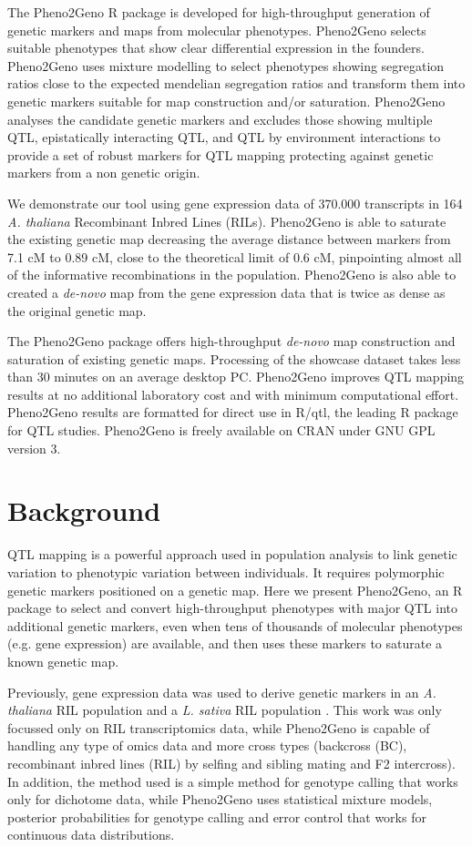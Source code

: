 The Pheno2Geno R package is developed for high-throughput generation of genetic markers and maps from 
molecular phenotypes. Pheno2Geno selects suitable phenotypes that show clear differential expression 
in the founders. Pheno2Geno uses mixture modelling to select phenotypes showing segregation ratios 
close to the expected mendelian segregation ratios and transform them into genetic markers suitable 
for map construction and/or saturation. Pheno2Geno analyses the candidate genetic markers and excludes 
those showing multiple QTL, epistatically interacting QTL, and QTL by environment interactions to 
provide a set of robust markers for QTL mapping protecting against genetic markers from a non genetic 
origin.

We demonstrate our tool using gene expression data of 370.000 transcripts in 164 \emph{A. thaliana} 
Recombinant Inbred Lines (RILs). Pheno2Geno is able to saturate the existing genetic map decreasing 
the average distance between markers from 7.1 cM to 0.89 cM, close to the theoretical limit of 0.6 cM, 
pinpointing almost all of the informative recombinations in the population. Pheno2Geno is also able 
to created a \emph{de-novo} map from the gene expression data that is twice as dense as the original 
genetic map.

The Pheno2Geno package offers high-throughput \emph{de-novo} map construction and saturation of 
existing genetic maps. Processing of the showcase dataset takes less than 30 minutes on an average 
desktop PC. Pheno2Geno improves QTL mapping results at no additional laboratory cost and with 
minimum computational effort. Pheno2Geno results are formatted for direct use in R/qtl, the leading 
R package for QTL studies. Pheno2Geno is freely available on CRAN under GNU GPL version 3.

\section{Background}
QTL mapping \cite{Lander:1989} is a powerful approach used in population analysis to link genetic 
variation to phenotypic variation between individuals. It requires polymorphic genetic markers 
positioned on a genetic map. Here we present Pheno2Geno, an R package to select and convert 
high-throughput phenotypes with major QTL into additional genetic markers, even when tens of 
thousands of molecular phenotypes (e.g. gene expression) are available, and then uses these markers 
to saturate a known genetic map.

Previously, gene expression data was used to derive genetic markers in an \emph{A. thaliana} RIL 
population \cite{West:2006} and a \emph{L. sativa} RIL population \cite{Truco:2013}. This work was 
only focussed only on RIL transcriptomics data, while Pheno2Geno is capable of handling any type 
of omics data and more cross types (backcross (BC), recombinant inbred lines (RIL) by selfing and 
sibling mating and F2 intercross). In addition, the method used \cite{West:2006, Truco:2013} is a 
simple method for genotype calling that works only for dichotome data, while Pheno2Geno uses 
statistical mixture models, posterior probabilities for genotype calling and error control that 
works for continuous data distributions\cite{Jansen:1993, Jansen:2001b}. 

